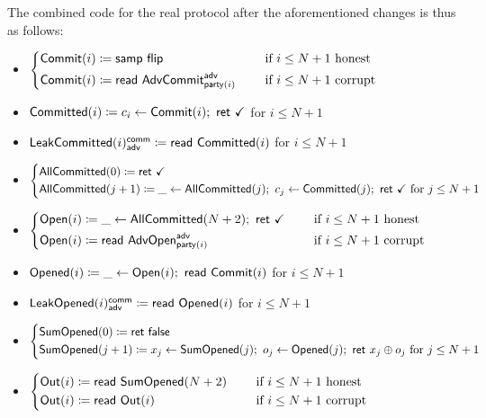 \noindent The combined code for the real protocol after the aforementioned changes is thus as follows:

\begin{itemize}
\item {\color{blue} $\begin{cases*} \Commit(i) \coloneqq \samp{\flip} & \hspace{10pt} \text{if $i \leq N+1$ honest} \\ \Commit(i) \coloneqq \read{\AdvCommit^\adv_{\party(i)}} & \hspace{10pt} \text{if $i \leq N+1$ corrupt} \end{cases*}$}
\item {\color{magenta} $\mathsf{Committed}(i) \coloneqq c_i \leftarrow \mathsf{Commit}(i); \ \mathsf{ret} \ \checkmark$ for $i \leq N+1$}
\item {\color{magenta} $\mathsf{LeakCommitted}(i)^{\mathsf{comm}}_{\mathsf{adv}} \coloneqq \mathsf{read} \ \mathsf{Committed}(i)$ for $i \leq N+1$}
\item {\color{magenta} $\begin{cases*} \AllCommitted(0) \coloneqq \ret{\checkmark} \\ \AllCommitted(j+1) \coloneqq \_ \leftarrow \AllCommitted(j); \ c_j \leftarrow \Committed(j); \ \ret{\checkmark} \text{ for $j \leq N+1$} \end{cases*}$}
\item {\color{teal} $\begin{cases*} \Open(i) \coloneqq \_ \leftarrow \AllCommitted(N+2); \ \ret{\checkmark} & \hspace{10pt} \text{if $i \leq N+1$ honest} \\ \Open(i) \coloneqq \read{\AdvOpen^\adv_{\party(i)}} & \hspace{10pt} \text{if $i \leq N+1$ corrupt} \end{cases*}$}
\item {\color{red} $\mathsf{Opened}(i) \coloneqq \_ \leftarrow \mathsf{Open}(i); \ \mathsf{read} \ \mathsf{Commit}(i)$ for $i \leq N+1$}
\item {\color{red} $\mathsf{LeakOpened}(i)^{\mathsf{comm}}_{\mathsf{adv}} \coloneqq \mathsf{read} \ \mathsf{Opened}(i)$ for $i \leq N+1$}
\item {\color{red} $\begin{cases*} \SumOpened(0) \coloneqq \ret{\false} \\ \SumOpened(j+1) \coloneqq x_j \leftarrow \SumOpened(j); \ o_j \leftarrow \Opened(j); \ \ret{x_j \oplus o_j} \text{ for $j \leq N+1$} \end{cases*}$}
\item $\begin{cases*} \Out(i) \coloneqq \read{\SumOpened(N+2)} & \hspace{10pt} \text{if $i \leq N+1$ honest} \\ \Out(i) \coloneqq \read{\Out(i)} & \hspace{10pt} \text{if $i \leq N+1$ corrupt} \end{cases*}$
\end{itemize}

